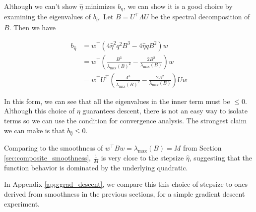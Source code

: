 \documentclass[11pt]{article}
\begin{document}
Although we can't show $\hat{\eta}$ minimizes $b_{\eta}$, we can show it is a good choice by examining the eigenvalues of $b_{\hat{\eta}}$. Let $B = U^{\top} \Lambda U$ be the spectral decomposition of $B$. Then we have

\begin{align*}
    b_{\hat{\eta}} &= w^{\top} ( 4 \hat{\eta}^2 q^2 B^3 - 4 \hat{\eta} q B^2)w \\
    &= w^{\top} \left( \frac{B^3}{\lambda_{\max}(B)^2} - \frac{2 B^2}{\lambda_{\max}(B)} \right) w \\
    &= w^{\top} U^{\top} \left( \frac{\Lambda^3}{\lambda_{\max}(B)^2} - \frac{2 \Lambda^2}{\lambda_{\max}(B)} \right) Uw
\end{align*}

In this form, we can see that all the eigenvalues in the inner term must be $\leq 0$. Although this choice of $\eta$ guarantees descent, there is not an easy way to isolate terms so we can use the condition for convergence analysis. The strongest claim we can make is that $b_{\hat{\eta}} \leq 0$.

Comparing to the smoothness of $w^{\top}Bw = \lambda_{\max}(B) = M$ from Section \ref{sec:composite_smoothness}, $\frac{1}{M}$ is very close to the stepsize $\hat{\eta}$, suggesting that the function behavior is dominated by the underlying quadratic.

In Appendix \ref{app:grad_descent}, we compare this this choice of stepsize to ones derived from smoothness in the previous sections, for a simple gradient descent experiment.



\end{document}
